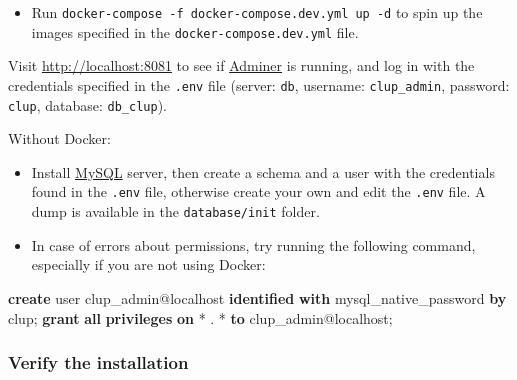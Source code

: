 \documentclass[
]{article}
\newenvironment{Shaded}{}{}
\newcommand{\FunctionTok}[1]{\textcolor[rgb]{0.02,0.16,0.49}{#1}}
\newcommand{\KeywordTok}[1]{\textcolor[rgb]{0.00,0.44,0.13}{\textbf{#1}}}
\newcommand{\NormalTok}[1]{#1}
\newcommand{\OperatorTok}[1]{\textcolor[rgb]{0.40,0.40,0.40}{#1}}
\newcommand{\StringTok}[1]{\textcolor[rgb]{0.25,0.44,0.63}{#1}}
\begin{document}
\begin{itemize}

\item
  Run \texttt{docker-compose\ -f\ docker-compose.dev.yml\ up\ -d} to spin up the images specified in
  the \texttt{docker-compose.dev.yml} file.
\end{itemize}

Visit \url{http://localhost:8081} to see if
\href{https://www.adminer.org}{Adminer} is running, and log in with the
credentials specified in the \texttt{.env} file (server: \texttt{db},
username: \texttt{clup\_admin}, password: \texttt{clup}, database:
\texttt{db\_clup}).

Without Docker:

\begin{itemize}

\item
  Install \href{https://www.mysql.com}{MySQL} server, then create a
  schema and a user with the credentials found in the \texttt{.env}
  file, otherwise create your own and edit the \texttt{.env} file. A dump is available in the \texttt{database/init} folder.
\end{itemize}


\begin{itemize}

\item
  In case of errors about permissions, try running the following
  command, especially if you are not using Docker:
\end{itemize}

\begin{Shaded}
\begin{Highlighting}[]
\KeywordTok{create} \FunctionTok{user}\NormalTok{ clup\_admin@localhost }\KeywordTok{identified} \KeywordTok{with}\NormalTok{ mysql\_native\_password }\KeywordTok{by} \StringTok{\textquotesingle{}clup\textquotesingle{}}\NormalTok{;}
\KeywordTok{grant} \KeywordTok{all} \KeywordTok{privileges} \KeywordTok{on} \OperatorTok{*}\NormalTok{ . }\OperatorTok{*} \KeywordTok{to}\NormalTok{ clup\_admin@localhost;}
\end{Highlighting}
\end{Shaded}

\hypertarget{verify-the-installation}{%
\subsubsection{Verify the installation}\label{verify-the-installation}}
\end{document}
